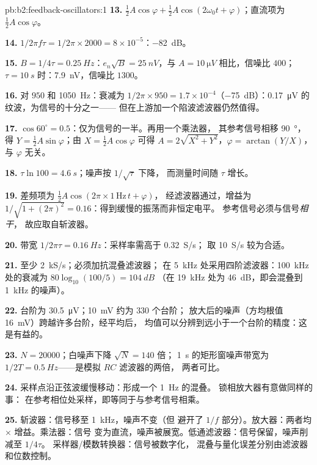 \begin{solution}{pb:b2:feedback-oscillators:1}
\textbf{13.} $\tfrac12A\cos\varphi + \tfrac12A\cos(2\omega_0t + \varphi)$；直流项为 $\tfrac12A\cos\varphi$。

\textbf{14.} $1/2\pi f\tau = 1/2\pi \times 2000 = 8 \times 10^{-5}$：\qty{-82}{dB}。

\textbf{15.} $B = 1/4\tau = \qty{0.25}{Hz}$：$e_n\sqrt B = \qty{25}{nV}$，与 $A =
\qty{10}{\micro V}$ 相比，信噪比 $400$；$\tau = \qty{10}{s}$ 时：\qty{7.9}{nV}，信噪比 $1300$。

\textbf{16.} 对 $950$ 和 \qty{1050}{Hz}：衰减为 $1/2\pi \times 950 = 1.7 \times
10^{-4}$（\qty{-75}{dB}）：\qty{0.17}{\micro V} 的纹波，为信号的十分之一——
但在上游加一个陷波滤波器仍然值得。

\textbf{17.} $\cos60^\circ = 0.5$：仅为信号的一半。再用一个乘法器，
其参考信号相移 \qty{90}{\degree}，得 $Y = \tfrac12A\sin\varphi$；由 $X =
\tfrac12A\cos\varphi$ 可得 $A = 2\sqrt{X^2 + Y^2}$，$\varphi = \arctan(Y/X)$，与 $\varphi$ 无关。

\textbf{18.} $\tau\ln100 = \qty{4.6}{s}$；噪声按 $1/\sqrt\tau$ 下降，
而测量时间随 $\tau$ 增长。

\textbf{19.} 差频项为 $\tfrac12A\cos(2\pi \times 1\,\text{Hz}\,t + \varphi)$，
经滤波器通过，增益为 $1/\sqrt{1 + (2\pi)^2} = 0.16$：得到缓慢的振荡而非恒定电平。
参考信号必须与信号\emph{相干}，
故应取自斩波器。

\textbf{20.} 带宽 $1/2\pi\tau = \qty{0.16}{Hz}$：采样率需高于 \qty{0.32}{S/s}；
取 \qty{10}{S/s} 较为合适。

\textbf{21.} 至少 \qty{2}{kS/s}；必须加抗混叠滤波器；
在 \qty{5}{kHz} 处采用四阶滤波器：\qty{100}{kHz} 处的衰减为 $80\log_{10}(100/5) = \qty{104}{dB}$
（在 \qty{19}{kHz} 处为 \qty{46}{dB}，即会混叠到 \qty{1}{kHz} 的噪声）。

\textbf{22.} 台阶为 \qty{30.5}{\micro V}；\qty{10}{mV} 约为 $330$ 个台阶；
放大后的噪声（方均根值 \qty{16}{mV}）跨越许多台阶，经平均后，
均值可以分辨到远小于一个台阶的精度：这是有益的。

\textbf{23.} $N = 20000$；白噪声下降 $\sqrt N = 140$ 倍；
\qty{1}{s} 的矩形窗噪声带宽为 $1/2T = \qty{0.5}{Hz}$——是模拟 $RC$ 滤波器的两倍，
两者可比。

\textbf{24.} 采样点沿正弦波缓慢移动：形成一个 \qty{1}{Hz} 的混叠。
锁相放大器有意做同样的事：
在参考相位处采样，即等同于与参考信号相乘。

\textbf{25.} 斩波器：信号移至 \qty{1}{kHz}，噪声不变（但
避开了 $1/f$ 部分）。放大器：两者均 $\times$ 增益。乘法器：信号
变为直流，噪声被展宽。低通滤波器：信号保留，噪声削减至 $1/4\tau$。
采样器/模数转换器：信号被数字化，
混叠与量化误差分别由滤波器和位数控制。
\end{solution}
